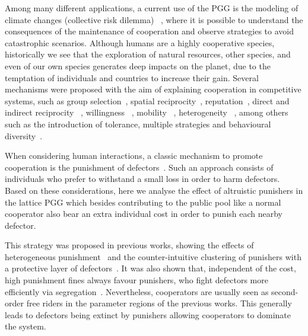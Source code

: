 \documentclass[5p]{elsarticle}
\begin{document}
Among many different applications, a current use of the PGG is the modeling of climate changes (collective risk dilemma) ~\cite{Yang2020, Curry2020, Gois2019, Vicens2018, Couto2020}, where it is possible to understand the consequences of the maintenance of cooperation and observe strategies to avoid catastrophic scenarios. 
%
Although humans are a highly cooperative species, historically we see that the exploration of natural resources, other species, and even of our own species generates deep impacts on the planet, due to the temptation of individuals and countries to increase their gain.
%
Several mechanisms were proposed with the aim of {explaining} cooperation in competitive systems, such as group selection~\cite{wilson_ds_an77}, spatial reciprocity~\cite{Nowak1992a, wardil_epl09, wardil_pre10, Zhao2020}, reputation~\cite{dos-santos_m_prsb11, brandt2003punishment}, direct and indirect reciprocity  ~\cite{nowak2006five, trivers_qrb71, axelrod_s81}, willingness ~\cite{brandt2006punishing, hauert2005game}, mobility ~\cite{vainstein2007does}, heterogeneity  ~\cite{perc_bs10, Amaral2016, Amaral2015, Amaral2020a, Amaral2020, Fang2019, Zhou2018}, among others such as the introduction of tolerance, multiple strategies and behavioural diversity~\cite{Wardil2017, Szolnoki2016a, Xu2017, Stewart2016, Hamilton1964, Junior2019}. 
 
When considering human interactions, a classic mechanism to promote cooperation is the punishment of defectors~\cite{Couto2020, yang2018promoting,boyd2003evolution, chen2014probabilistic, perc2015double, szolnoki2011phase, helbing2010evolutionary, rand2010anti, Fang2019a}. Such an approach consists of individuals who prefer
to withstand a small loss in order to harm defectors.
%
Based on these considerations, here we analyse the effect of altruistic punishers in the lattice PGG which besides contributing to the public pool like a normal cooperator also bear an extra individual cost in order to punish {each} nearby defector.

%
This strategy was proposed in previous works, showing the effects of heterogeneous punishment~\cite{perc2015double} and the counter-intuitive clustering of punishers with a protective layer of defectors~\cite{Szolnoki2017a}. It was also shown that,  independent of the cost, high punishment fines always favour punishers, who fight defectors more efficiently via segregation~\cite{Helbing_2010}. Nevertheless, cooperators are usually seen as second-order free riders in the parameter regions of the previous works. This generally leads to defectors being extinct by punishers allowing cooperators to dominate the system.
\end{document}
